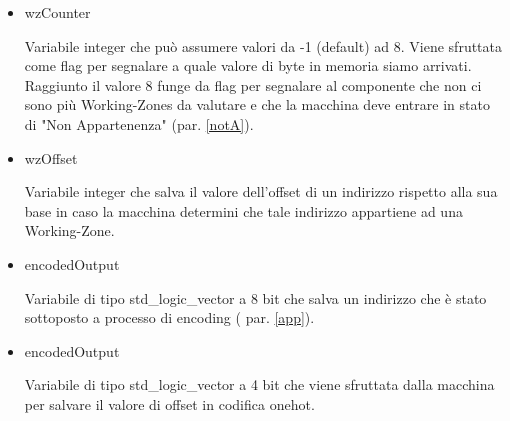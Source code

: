 \documentclass{article}
\newenvironment{gitFont}{\fontfamily{zi4}\selectfont}{\par}
\begin{document}
\begin{flushleft}
\begin{itemize}
\item \begin{gitFont}
wzCounter
\end{gitFont} Variabile integer che  può assumere valori da -1 (default) ad 8. Viene sfruttata come flag per segnalare a quale valore di byte in memoria siamo arrivati. Raggiunto il valore 8 funge da flag per segnalare al componente che non ci sono più Working-Zones da valutare e che la macchina deve entrare in stato di "Non Appartenenza" (par. \ref{notA}).

\item \begin{gitFont}
wzOffset
\end{gitFont} Variabile integer che salva il valore dell'offset di un indirizzo rispetto alla sua base in caso la macchina determini che tale indirizzo appartiene ad una Working-Zone.

\item \begin{gitFont}
encodedOutput
\end{gitFont} Variabile di tipo std{\_}logic{\_}vector a 8 bit che salva un indirizzo che è stato sottoposto a processo di encoding ( par. \ref{app}).

\item \begin{gitFont}
encodedOutput
\end{gitFont} Variabile di tipo std{\_}logic{\_}vector a 4 bit che viene sfruttata dalla macchina per salvare il valore di offset in codifica onehot.

\end{itemize}

\end{flushleft}
\end{document}
